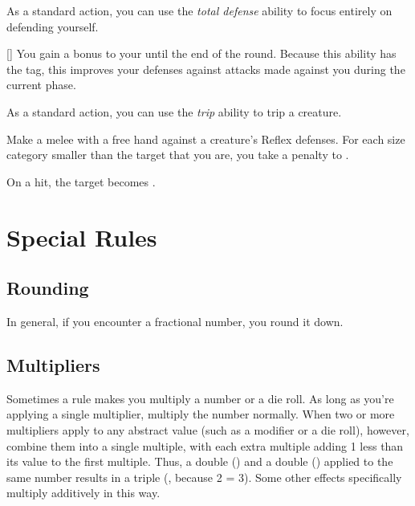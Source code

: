          As a standard action, you can use the \textit{total defense} ability to focus entirely on defending yourself.

        \begin{freeability}{}[]
            You gain a  bonus to your  until the end of the round.
            Because this ability has the  tag, this improves your defenses against attacks made against you during the current phase.
        \end{freeability}

         As a standard action, you can use the \textit{trip} ability to trip a creature.

        \begin{freeability}{}
            Make a melee  with a free hand against a creature's Reflex defenses.
            For each size category smaller than the target that you are, you take a  penalty to .

            On a hit, the target becomes \prone.
        \end{freeability}

\section{Special Rules}

    \subsection{Rounding}
        In general, if you encounter a fractional number, you round it down.

    \subsection{Multipliers}
        Sometimes a rule makes you multiply a number or a die roll.
        As long as you're applying a single multiplier, multiply the number normally.
        When two or more multipliers apply to any abstract value (such as a modifier or a die roll), however, combine them into a single multiple, with each extra multiple adding 1 less than its value to the first multiple.
        Thus, a double () and a double () applied to the same number results in a triple (, because 2  = 3).
        Some other effects specifically multiply additively in this way.

